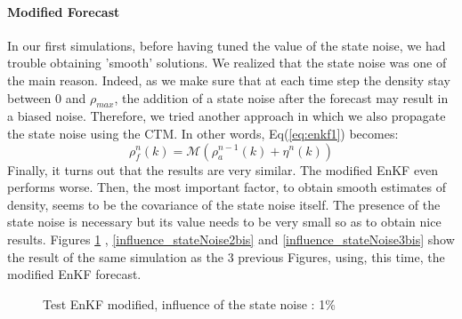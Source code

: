 \documentclass[letterpaper,10pt]{article}
\begin{document}
\paragraph{Modified Forecast}
In our first simulations, before having tuned the value of the state noise, we had trouble obtaining 'smooth' solutions. We realized that the state noise was one of the main reason. Indeed, as we make sure that at each time step the density stay between $0$ and $\rho_{max}$, the addition of a state  noise after the forecast may result in a biased noise. Therefore, we tried another approach in which we also propagate the state noise using the CTM. In other words, Eq(\ref{eq:enkf1}) becomes: 
\begin{equation}
\rho_{f}^{n}(k) =\mathcal{M}(\rho_{a}^{n-1}(k)+\eta^{n}(k))\label{eq:enkf1_modif}
\end{equation}
Finally, it turns out that the results are very similar. The modified EnKF even performs worse. Then, the most important factor, to obtain smooth estimates of density, seems to be the covariance of the state noise itself. The presence of the state noise is necessary but its value needs to be very small so as to obtain nice results. Figures \ref{influence_stateNoise1bis} , \ref{influence_stateNoise2bis} and \ref{influence_stateNoise3bis} show the result of the same simulation as the 3 previous Figures, using, this time, the modified EnKF forecast.
\begin{figure}
  \centering
  \caption{Test EnKF modified, influence of the state noise : 1\%}\label{influence_stateNoise1bis}
\end{figure}
\end{document}
